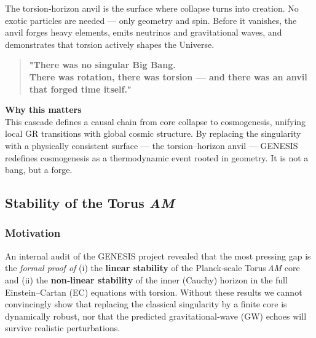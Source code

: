 \documentclass{article}
\begin{document}
\noindent The torsion-horizon anvil is the surface where collapse turns into creation.
No exotic particles are needed --- only geometry and spin.
Before it vanishes, the anvil forges heavy elements, emits neutrinos and gravitational waves, and demonstrates that torsion actively shapes the Universe.

\begin{quotation}
\centering
\textbf{"There was no singular Big Bang.  \\ There was rotation, there was torsion --- and there was an anvil that forged time itself."}
\end{quotation}


\begin{tcolorbox}[
  colback=white,
  colframe=black!30,
  boxrule=0.3pt,
  arc=2pt,
  left=6pt,
  right=6pt,
  top=4pt,
  bottom=4pt,
  enhanced
]
\textbf{Why this matters} \\
\vspace{2pt}
This cascade defines a causal chain from core collapse to cosmogenesis, unifying local GR transitions with global cosmic structure. By replacing the singularity with a physically consistent surface — the torsion–horizon anvil — GENESIS redefines cosmogenesis as a thermodynamic event rooted in geometry. It is not a bang, but a forge.
\end{tcolorbox}



\subsection{Stability of the Torus \textit{AM}}
\label{sec:TorusAM-stability}

\subsubsection{Motivation}
An internal audit of the GENESIS project revealed that the most 
pressing gap is the \emph{formal proof of}  
(i) the \textbf{linear stability} of the Planck‑scale Torus\,\textit{AM} core  
and (ii) the \textbf{non‑linear stability} of the inner (Cauchy) horizon in the full
Einstein–Cartan (EC) equations with torsion.  
Without these results we cannot convincingly show that replacing the
classical singularity by a finite core is dynamically robust, nor that the
predicted gravitational‑wave (GW) echoes will survive realistic perturbations.
\end{document}
